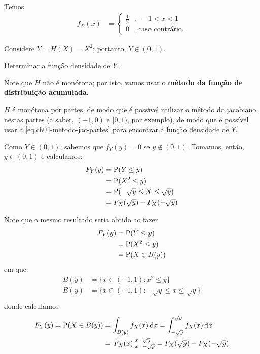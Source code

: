 \begin{example}
    Temos
    \begin{align*}
        f_X(x) &= \begin{cases}
            \frac{1}{2} &,\ -1 < x < 1 \\
            0 &,\ \text{caso contrário.}
        \end{cases}
    \end{align*}

    Considere $Y = H(X) = X^2$; portanto, $Y \in (0, 1)$.

    Determinar a função densidade de $Y$.

    \bigskip
    Note que $H$ não é monótona; por isto, vamos usar
    o \textbf{método da função de distribuição acumulada}.

    \begin{obs}
        $H$ é monótona por partes, de modo que
        é possível utilizar o método do jacobiano
        nestas partes (a saber, $(-1, 0)$ e $[0, 1)$, por exemplo),
        de modo que é possível usar a
        \cref{eq:ch04-metodo-jac-partes} para encontrar
        a função densidade de $Y$.
    \end{obs}
    
    Como $Y \in (0, 1)$, sabemos que $f_Y(y) = 0$ se 
    $y \notin (0, 1)$. Tomamos, então, $y \in (0, 1)$ e calculamos:
    \begin{align*}
        F_Y(y) &= \operatorname{P}(Y \le y) \\
        &= \operatorname{P}(X^2 \le y) \\
        &= \operatorname{P}(-\sqrt{y} \le X \le \sqrt{y}) \\
        &= F_X(\sqrt{y}) - F_X(-\sqrt{y})
    \end{align*}

    \begin{obs}
        Note que o mesmo resultado seria obtido ao fazer
        \begin{align*}
            F_Y(y) &= \operatorname{P}(Y \le y) \\
            &= \operatorname{P}(X^2 \le y) \\
            &= \operatorname{P}(X \in B(y))
        \end{align*}
        em que
        \begin{align*}
            B(y) &= \{x \in (-1, 1) : x^2 \le y \} \\
            B(y) &= \{x \in (-1, 1) 
                : -\sqrt{y} \le x \le \sqrt{y} \} \\
        \end{align*}
        donde calculamos
        \begin{align*}
            F_Y(y) = \operatorname{P}(X \in B(y))
            &= \int_{B(y)} f_X(x) \,\mathrm{d} x
            = \int_{-\sqrt{y}}^{\sqrt{y}} f_X(x) \,\mathrm{d} x \\
            &= \left.F_X(x)\right|_{x=-\sqrt{y}}^{x=\sqrt{y}}
            = F_X(\sqrt{y}) - F_X(-\sqrt{y})
        \end{align*}
    \end{obs}


\end{example}
